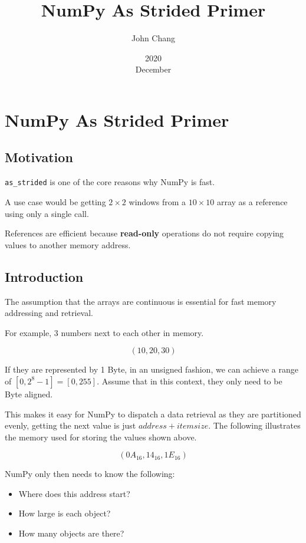 \documentclass[oneside, 12pt]{report}
\title{NumPy As Strided Primer}
\date{2020\\ December}
\author{John Chang}
\begin{document}
\maketitle
\newpage

\chapter{NumPy As Strided Primer}

\section{Motivation}

\verb+as_strided+ is one of the core reasons why NumPy is fast.

A use case would be getting $2 \times 2$ windows from a $10 \times 10$ array as a reference using only a single call.

References are efficient because \textbf{read-only} operations do not require copying values to another memory address.

\section{Introduction}

The assumption that the arrays are continuous is essential for fast memory addressing and retrieval.

For example, 3 numbers next to each other in memory.

$$(10, 20, 30)$$

If they are represented by 1 Byte, in an unsigned fashion, we can achieve a range of $[0, 2^{8}-1] = [0, 255]$. Assume that in this context, they only need to be Byte aligned.

This makes it easy for NumPy to dispatch a data retrieval as they are partitioned evenly, getting the next value is just $address + itemsize$. The following illustrates the memory used for storing the values shown above.

$$(0A_{16}, 14_{16}, 1E_{16})$$

NumPy only then needs to know the following:

\begin{itemize}
\item{Where does this address start?}
\item{How large is each object?}
\item{How many objects are there?}
\end{itemize}
\end{document}
